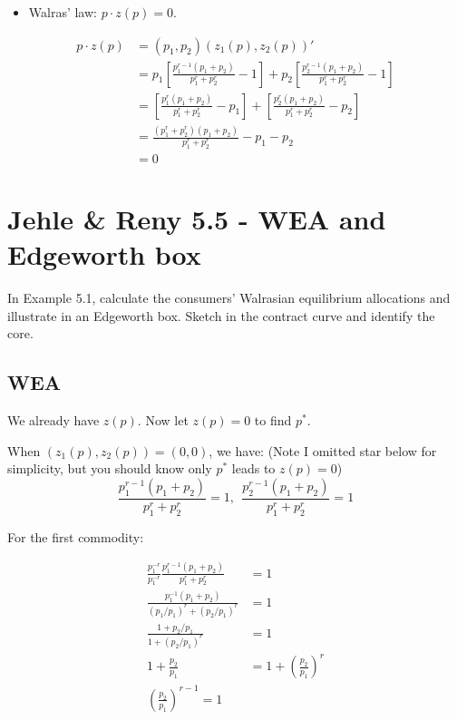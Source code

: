\documentclass{article}
\begin{document}
\begin{mdframed}[backgroundcolor=blue!20,linecolor=white]
\begin{itemize}
\item Walras' law: $p \cdot z(p) = 0$.
\end{itemize}
\end{mdframed}

\begin{align*}
p \cdot z(p) &= (p_1,p_2)(z_1(p),z_2(p))' \\
&= p_1 [\frac{p^{r-1}_1 (p_1+p_2)}{p_1^r+p_2^r} -1] + p_2 [\frac{p^{r-1}_2 (p_1+p_2)}{p_1^r+p_2^r} -1] \\
&= [\frac{p^r_1 (p_1+p_2)}{p_1^r+p_2^r} -p_1] + [\frac{p^{r}_2 (p_1+p_2)}{p_1^r+p_2^r} -p_2]  \\
&= \frac{(p^r_1+p^r_2) (p_1+p_2)}{p_1^r+p_2^r} -p_1 - p_2 \\
&=0
\end{align*}




\section{Jehle \& Reny 5.5 - WEA and Edgeworth box}

In Example 5.1, calculate the consumers' Walrasian equilibrium allocations and illustrate in an
Edgeworth box. Sketch in the contract curve and identify the core.


\subsection{WEA}

We already have $z(p)$. Now let $z(p)=0$ to find $p^*$.

When $ (z_1(p),z_2(p)) = (0,0)$, we have:
(Note I omitted star below for simplicity, but you should know only $p^*$ leads to $z(p)=0$)
$$\frac{p^{r-1}_1 (p_1+p_2)}{p_1^r+p_2^r} =1, \ \ \frac{p^{r-1}_2 (p_1+p_2)}{p_1^r+p_2^r} =1$$

For the first commodity:

\begin{align*}
\frac{p^{-r}_1}{p^{-r}_1}\frac{p^{r-1}_1 (p_1+p_2)}{p_1^r+p_2^r} &=1 \\
\frac{p^{-1}_1 (p_1+p_2)}{(p_1/p_1)^r+(p_2/p_1)^r} &=1 \\
\frac{1+p_2/p_1}{1+(p_2/p_1)^r} &=1 \\
1+\frac{p_2}{p_1} &=1+(\frac{p_2}{p_1})^r \\
(\frac{p_2}{p_1})^{r-1} = 1
\end{align*}
\end{document}
